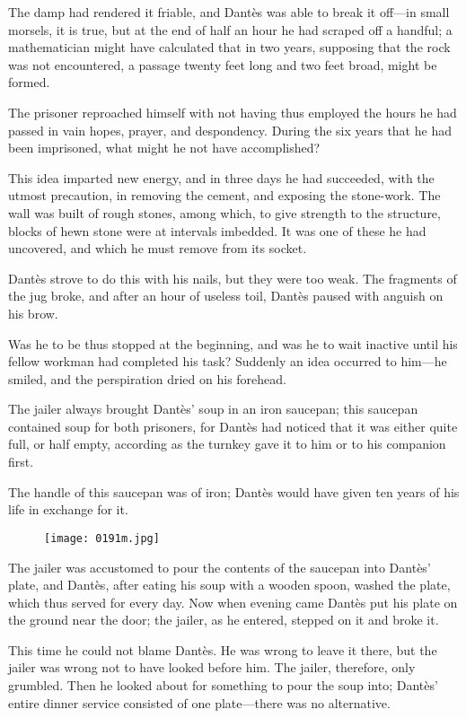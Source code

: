 The damp had rendered it friable, and Dantès was able to break it
off—in small morsels, it is true, but at the end of half an hour he had
scraped off a handful; a mathematician might have calculated that in
two years, supposing that the rock was not encountered, a passage
twenty feet long and two feet broad, might be formed.

The prisoner reproached himself with not having thus employed the hours
he had passed in vain hopes, prayer, and despondency. During the six
years that he had been imprisoned, what might he not have accomplished?

This idea imparted new energy, and in three days he had succeeded, with
the utmost precaution, in removing the cement, and exposing the
stone-work. The wall was built of rough stones, among which, to give
strength to the structure, blocks of hewn stone were at intervals
imbedded. It was one of these he had uncovered, and which he must
remove from its socket.

Dantès strove to do this with his nails, but they were too weak. The
fragments of the jug broke, and after an hour of useless toil, Dantès
paused with anguish on his brow.

Was he to be thus stopped at the beginning, and was he to wait inactive
until his fellow workman had completed his task? Suddenly an idea
occurred to him—he smiled, and the perspiration dried on his forehead.

The jailer always brought Dantès’ soup in an iron saucepan; this
saucepan contained soup for both prisoners, for Dantès had noticed that
it was either quite full, or half empty, according as the turnkey gave
it to him or to his companion first.

The handle of this saucepan was of iron; Dantès would have given ten
years of his life in exchange for it.

\begin{figure}[ht]
\texttt{[image: 0191m.jpg]}
\end{figure}

The jailer was accustomed to pour the contents of the saucepan into
Dantès’ plate, and Dantès, after eating his soup with a wooden spoon,
washed the plate, which thus served for every day. Now when evening
came Dantès put his plate on the ground near the door; the jailer, as
he entered, stepped on it and broke it.

This time he could not blame Dantès. He was wrong to leave it there,
but the jailer was wrong not to have looked before him. The jailer,
therefore, only grumbled. Then he looked about for something to pour
the soup into; Dantès’ entire dinner service consisted of one
plate—there was no alternative.


